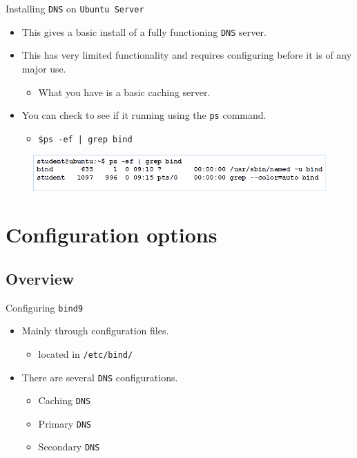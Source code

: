 \documentclass[aspectratio=169]{beamer}
\begin{document}
\begin{frame}{Installing \texttt{DNS} on \texttt{Ubuntu Server}}
  \begin{itemize}
    \item This gives a basic install of a fully functioning \texttt{DNS} server.
    \item This has very limited functionality and requires configuring before it is of any major use.
      \begin{itemize}
        \item What you have is a basic caching server.
      \end{itemize}
  \item You can check to see if it running using the \texttt{ps} command.
      \begin{itemize}
        \item \texttt{\$ps -ef | grep bind}
      \end{itemize}
    \end{itemize}
  \begin{figure}
    \begin{center}
      \includegraphics[width=0.9\linewidth]{ps-bind.png}
    \end{center}
  \end{figure}
\end{frame}

\section{Configuration options}
\subsection{Overview}
\begin{frame}{Configuring \texttt{bind9}}
  \begin{itemize}
    \item Mainly through configuration files.
      \begin{itemize}
        \item located in \texttt{/etc/bind/}
      \end{itemize}
    \item There are several \texttt{DNS} configurations.
      \begin{itemize}
        \item Caching \texttt{DNS}
        \item Primary \texttt{DNS}
        \item Secondary \texttt{DNS}
      \end{itemize}
  \end{itemize}
\end{frame}
\end{document}
